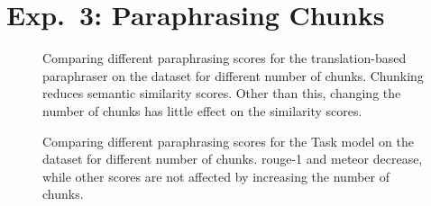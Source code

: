 \section{Exp.\ 3: Paraphrasing Chunks}
\label{sec:app_chunks}

\begin{figure}[H]
    \centering
    
    \caption[Paraphrasing scores for the translation-based paraphraser]{Comparing different paraphrasing scores for the translation-based paraphraser on the \dataGutenberg{} dataset for different number of chunks. 
    Chunking reduces semantic similarity scores.
    Other than this, changing the number of chunks has little effect on the similarity scores.}
    \label{fig:abl_chunks_gutenberg_translation}
\end{figure}

\begin{figure}[H]
    \centering
    
    \caption[Paraphrasing scores for the Task model]{Comparing different paraphrasing scores for the Task model on the \dataStudent{} dataset for different number of chunks. 
    \ac{rouge}-1 and \ac{meteor} decrease, while other scores are not affected by increasing the number of chunks.}
    \label{fig:abl_chunks_student_essays_task}
\end{figure}
